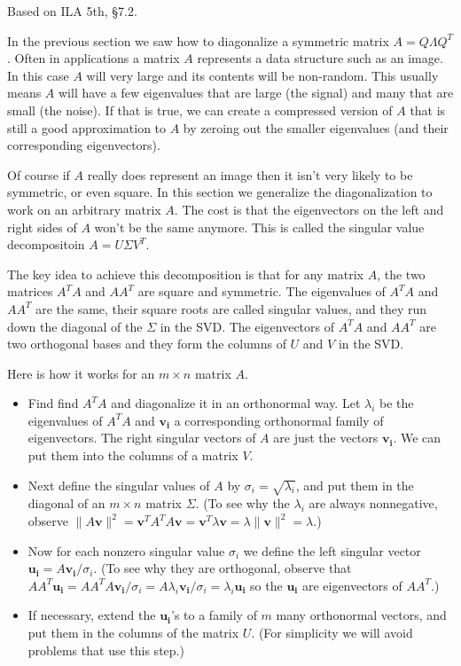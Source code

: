 \documentclass[11pt,oneside]{amsbook}
\theoremstyle{definition}
\theoremstyle{plain}
\theoremstyle{definition}
\theoremstyle{remark}
\numberwithin{equation}{section}
\numberwithin{figure}{section}
\begin{document}
Based on ILA 5th, \S 7.2.

In the previous section we saw how to diagonalize a symmetric matrix $A=Q\Lambda Q^T$. Often in applications a matrix $A$ represents a data structure such as an image. In this case $A$ will very large and its contents will be non-random. This usually means $A$ will have a few eigenvalues that are large (the signal) and many that are small (the noise). If that is true, we can create a compressed version of $A$ that is still a good approximation to $A$ by zeroing out the smaller eigenvalues (and their corresponding eigenvectors).

Of course if $A$ really does represent an image then it isn't very likely to be symmetric, or even square. In this section we generalize the diagonalization to work on an arbitrary matrix $A$. The cost is that the eigenvectors on the left and right sides of $A$ won't be the same anymore. This is called the singular value decompositoin $A=U\Sigma V^T$.

The key idea to achieve this decomposition is that for any matrix $A$, the two matrices $A^TA$ and $AA^T$ are square and symmetric. The eigenvalues of $A^TA$ and $AA^T$ are the same, their square roots are called singular values, and they run down the diagonal of the $\Sigma$ in the SVD. The eigenvectors of $A^TA$ and $AA^T$ are two orthogonal bases and they form the columns of $U$ and $V$ in the SVD.

Here is how it works for an $m\times n$ matrix $A$.

\begin{itemize}
  \item Find find $A^TA$ and diagonalize it in an orthonormal way. Let $\lambda_i$ be the eigenvalues of $A^TA$ and $\mathbf{v_i}$ a corresponding orthonormal family of eigenvectors. The right singular vectors of $A$ are just the vectors $\mathbf{v_i}$. We can put them into the columns of a matrix $V$.
  \item Next define the singular values of $A$ by $\sigma_i=\sqrt{\lambda_i}$, and put them in the diagonal of an $m\times n$ matrix $\Sigma$. (To see why the $\lambda_i$ are always nonnegative, observe $\|A\mathbf{v}\|^2=\mathbf{v}^TA^TA\mathbf{v}=\mathbf{v}^T\lambda\mathbf{v}=\lambda\|\mathbf{v}\|^2=\lambda$.)
  \item Now for each nonzero singular value $\sigma_i$ we define the left singular vector $\mathbf{u_i}=A\mathbf{v_i}/\sigma_i$. (To see why they are orthogonal, observe that $AA^T\mathbf{u_i}=AA^TA\mathbf{v_i}/\sigma_i=A\lambda_i\mathbf{v_i}/\sigma_i=\lambda_i\mathbf{u_i}$ so the $\mathbf{u_i}$ are eigenvectors of $AA^T$.)
  \item If necessary, extend the $\mathbf{u_i}$'s to a family of $m$ many orthonormal vectors, and put them in the columns of the matrix $U$. (For simplicity we will avoid problems that use this step.)
\end{itemize}
\end{document}
